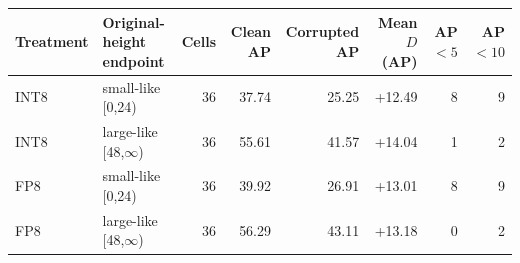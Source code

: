 \begin{tabular}{llrrrrrr}
\toprule
Treatment & Original-height endpoint & Cells & Clean AP & Corrupted AP & Mean $D$ (AP) & AP$<5$ & AP$<10$ \\
\midrule
INT8 & small-like [0,24) & 36 & 37.74 & 25.25 & +12.49 & 8 & 9 \\
INT8 & large-like [48,$\infty$) & 36 & 55.61 & 41.57 & +14.04 & 1 & 2 \\
FP8 & small-like [0,24) & 36 & 39.92 & 26.91 & +13.01 & 8 & 9 \\
FP8 & large-like [48,$\infty$) & 36 & 56.29 & 43.11 & +13.18 & 0 & 2 \\
\bottomrule
\end{tabular}
